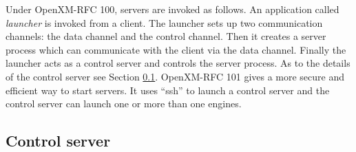 Under OpenXM-RFC 100, servers are invoked as follows.
An application called {\it launcher} is invoked from a client.
The launcher sets up two communication channels: the data channel 
and the control channel. 
Then it creates a server process which can communicate
with the client via the data channel. Finally the launcher
acts as a control server and controls the server process.
As to the details of the control server see Section \ref{control}.
OpenXM-RFC 101\cite{ox-rfc-101} gives a more secure and
efficient way to start servers.
It uses ``ssh'' to launch a control server and 
the control server can launch one or more than one
engines.

\subsection{Control server}
\label{control}
%
%

